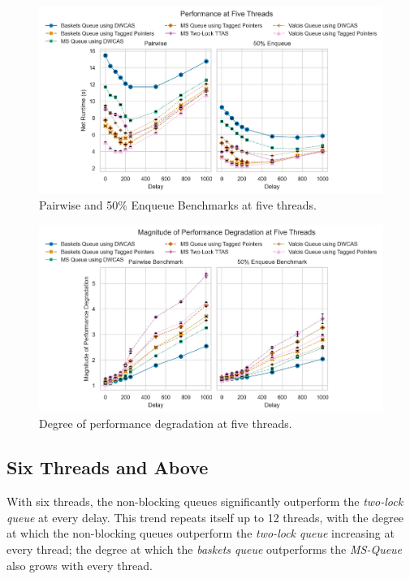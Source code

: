 \begin{figure}[!ht]
    \centering
    \includegraphics[width=1\textwidth]{images/plots/delay_thread_5.jpg}
    \caption{Pairwise and 50\% Enqueue Benchmarks at five threads.}
    \label{fig:perf_5_thread}
\end{figure}

\begin{figure}[!ht]
    \centering
    \includegraphics[width=1\textwidth]{images/plots/speedup_4.jpg}
    \caption{Degree of performance degradation at five threads.}
    \label{fig:perf_deg_5_thread}
\end{figure}

\subsection{Six Threads and Above}
With six threads, the non-blocking queues significantly outperform the
\emph{two-lock queue} at every delay. This trend repeats itself up to 12
threads, with the degree at which the non-blocking queues outperform the
\emph{two-lock queue} increasing at every thread; the degree at which the
\emph{baskets queue} outperforms the \emph{MS-Queue} also grows with every
thread.


